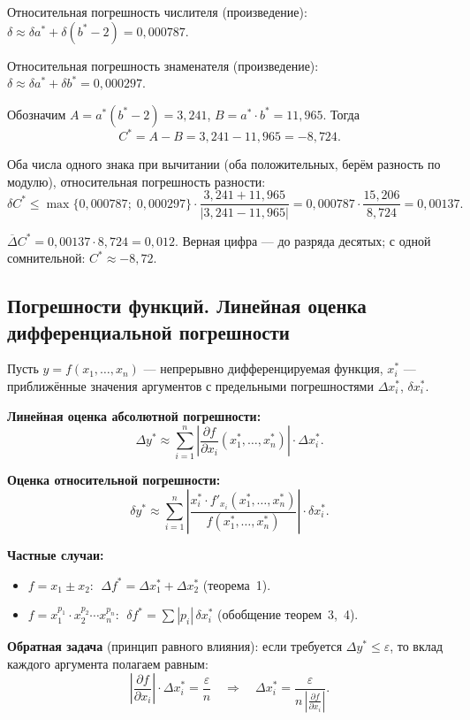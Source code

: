 Относительная погрешность числителя (произведение): $\delta \approx \delta a^* + \delta(b^*-2) = 0{,}000787$.

Относительная погрешность знаменателя (произведение): $\delta \approx \delta a^* + \delta b^* = 0{,}000297$.

Обозначим $A = a^*(b^*-2) = 3{,}241$, $B = a^* \cdot b^* = 11{,}965$. Тогда
\[
    C^* = A - B = 3{,}241 - 11{,}965 = -8{,}724.
\]

Оба числа одного знака при вычитании (оба положительных, берём разность по модулю), относительная погрешность разности:
\[
    \delta C^* \leq \max\{0{,}000787;\; 0{,}000297\} \cdot \frac{3{,}241 + 11{,}965}{|3{,}241 - 11{,}965|} = 0{,}000787 \cdot \frac{15{,}206}{8{,}724} = 0{,}00137.
\]

$\overline{\Delta} C^* = 0{,}00137 \cdot 8{,}724 = 0{,}012$. Верная цифра --- до разряда десятых; с одной сомнительной: $C^* \approx -8{,}72$.


\subsection{Погрешности функций. Линейная оценка дифференциальной погрешности}

Пусть $y = f(x_1, \ldots, x_n)$ --- непрерывно дифференцируемая функция, $x_i^*$ --- приближённые значения аргументов с предельными погрешностями $\Delta x_i^*$, $\delta x_i^*$.

\textbf{Линейная оценка абсолютной погрешности:}
\[
    \Delta y^* \approx \sum_{i=1}^{n} \left|\frac{\partial f}{\partial x_i}(x_1^*, \ldots, x_n^*)\right| \cdot \Delta x_i^*.
\]

\textbf{Оценка относительной погрешности:}
\[
    \delta y^* \approx \sum_{i=1}^{n} \left|\frac{x_i^* \cdot f'_{x_i}(x_1^*, \ldots, x_n^*)}{f(x_1^*, \ldots, x_n^*)}\right| \cdot \delta x_i^*.
\]

\textbf{Частные случаи:}
\begin{itemize}
    \item $f = x_1 \pm x_2$: $\;\Delta f^* = \Delta x_1^* + \Delta x_2^*$ (теорема~1).
    \item $f = x_1^{p_1} \cdot x_2^{p_2} \cdots x_n^{p_n}$: $\;\delta f^* = \sum |p_i|\,\delta x_i^*$ (обобщение теорем~3,~4).
\end{itemize}

\textbf{Обратная задача} (принцип равного влияния): если требуется $\Delta y^* \leq \varepsilon$, то вклад каждого аргумента полагаем равным:
\[
    \left|\frac{\partial f}{\partial x_i}\right| \cdot \Delta x_i^* = \frac{\varepsilon}{n}
    \quad\Longrightarrow\quad
    \Delta x_i^* = \frac{\varepsilon}{\displaystyle n\,\left|\frac{\partial f}{\partial x_i}\right|}.
\]

